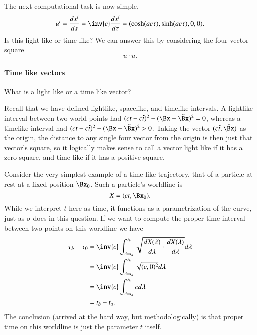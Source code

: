 {%
The next computational task is now simple.
\begin{equation}\label{eqn:relativisticElectrodynamicsT2:77}
u^i
= \frac{dx^i}{ds}
= \inv{c} \frac{dx^i}{d\tau}
= ( \cosh( a c \tau ), \sinh( a c \tau ), 0, 0).
\end{equation}
%
Is this light like or time like?  We can answer this by considering the four vector square
%
\begin{equation}\label{eqn:relativisticElectrodynamicsT2:80}
u \cdot u.
\end{equation}
%
\paragraph{Time like vectors}
%
What is a light like or a time like vector?

Recall that we have defined lightlike, spacelike, and timelike intervals.  A lightlike interval between two world points had \((ct - c\tilde{t})^2 - (\Bx -\tilde{\Bx})^2 = 0\), whereas a timelike interval had \((ct - c\tilde{t})^2 - (\Bx -\tilde{\Bx})^2 > 0\).  Taking the vector \((c \tilde{t}, \tilde{\Bx})\) as the origin, the distance to any single four vector from the origin is then just that vector's square, so it logically makes sense to call a vector light like if it has a zero square, and time like if it has a positive square.

Consider the very simplest example of a time like trajectory, that of a particle at rest at a fixed position \(\Bx_0\).  Such a particle's worldline is
%
\begin{equation}\label{eqn:relativisticElectrodynamicsT2:71}
X = ( c t, \Bx_0 ).
\end{equation}
%
While we interpret \(t\) here as time, it functions as a parametrization of the curve, just as \(\sigma\) does in this question.  If we want to compute the proper time interval between two points on this worldline we have
%
\begin{equation}\label{eqn:relativisticElectrodynamicsT2:2140}
\begin{aligned}
\tau_b - \tau_0
&=
\inv{c} \int_{\lambda = t_a}^{t_b} \sqrt{ \frac{dX(\lambda)}{d\lambda} \cdot \frac{dX(\lambda)}{d\lambda} } d\lambda \\
&=
\inv{c} \int_{\lambda = t_a}^{t_b} \sqrt{ (c, 0)^2 } d\lambda \\
&=
\inv{c} \int_{\lambda = t_a}^{t_b} c d\lambda \\
&= t_b - t_a.
\end{aligned}
\end{equation}
%
The conclusion (arrived at the hard way, but methodologically) is that proper time on this worldline is just the parameter \(t\) itself.

}
